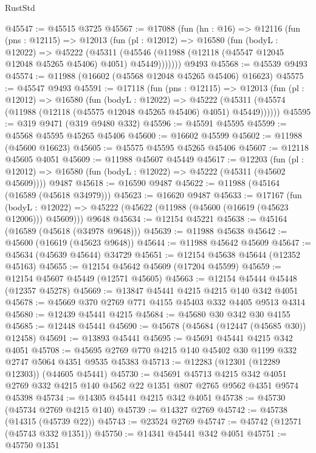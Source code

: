 \begin{lexlean}{RustStd}
\begin{coremodule}
@45547 := @45515 @3725
@45567 := @17088
    (fun (hn : @16) =>
    @12116
      (fun (pns : @12115) =>
      @12013
        (fun (pl : @12012) =>
        @16580
          (fun (bodyL : @12022) =>
          @45222
            (@45311
              (@45546 (@11988 (@12118 (@45547 @12045 @12048 @45265 @45406) @4051) @45449)))))))
    @9493
@45568 := @45539 @9493
@45574 := @11988 (@16602 (@45568 @12048 @45265 @45406) @16623)
@45575 := @45547 @9493
@45591 := @17118
    (fun (pns : @12115) =>
    @12013
      (fun (pl : @12012) =>
      @16580
        (fun (bodyL : @12022) =>
        @45222 (@45311 (@45574 (@11988 (@12118 (@45575 @12048 @45265 @45406) @4051) @45449))))))
@45595 := @319 @9471 (@319 @9480 @332)
@45596 := @45591 @45595
@45599 := @45568 @45595 @45265 @45406
@45600 := @16602 @45599
@45602 := @11988 (@45600 @16623)
@45605 := @45575 @45595 @45265 @45406
@45607 := @12118 @45605 @4051
@45609 := @11988 @45607 @45449
@45617 := @12203
    (fun (pl : @12012) => @16580 (fun (bodyL : @12022) => @45222 (@45311 (@45602 @45609))))
    @9487
@45618 := @16590 @9487
@45622 := @11988 (@45164 (@16589 (@45618 @34979)))
@45623 := @16620 @9487
@45633 := @17167
    (fun (bodyL : @12022) => @45222 (@45622 (@11988 (@45600 (@16619 (@45623 @12006))) @45609)))
    @9648
@45634 := @12154 @45221
@45638 := @45164 (@16589 (@45618 (@34978 @9648)))
@45639 := @11988 @45638
@45642 := @45600 (@16619 (@45623 @9648))
@45644 := @11988 @45642 @45609
@45647 := @45634 (@45639 @45644) @34729
@45651 := @12154 @45638 @45644 (@12352 @45163)
@45655 := @12154 @45642 @45609 (@17204 @45599)
@45659 := @12154 @45607 @45449 (@12571 @45605)
@45663 := @12154 @45444 @45448 (@12357 @45278)
@45669 := @13847 @45441 @4215 @4215 @140 @342 @4051
@45678 := @45669 @370 @2769 @771 @4155 @45403 @332 @4405 @9513 @4314
@45680 := @12439 @45441 @4215
@45684 := @45680 @30 @342 @30 @4155
@45685 := @12448 @45441
@45690 := @45678 (@45684 (@12447 (@45685 @30)) @12458)
@45691 := @13893 @45441
@45695 := @45691 @45441 @4215 @342 @4051
@45708 := @45695 @2769 @770 @4215 @140 @45402 @30 @1199 @332 @2747 @5064 @4351 @9535 @45383
@45713 := @12283 (@12301 (@12289 @12303)) (@44605 @45441)
@45730 := @45691
    @45713
    @4215
    @342
    @4051
    @2769
    @332
    @4215
    @140
    @4562
    @22
    @1351
    @807
    @2765
    @9562
    @4351
    @9574
    @45398
@45734 := @14305 @45441 @4215 @342 @4051
@45738 := @45730 (@45734 @2769 @4215 @140)
@45739 := @14327 @2769
@45742 := @45738 (@14315 (@45739 @22))
@45743 := @23524 @2769
@45747 := @45742 (@12571 (@45743 @332 @1351))
@45750 := @14341 @45441 @342 @4051
@45751 := @45750 @1351

\end{coremodule}
\end{lexlean}
